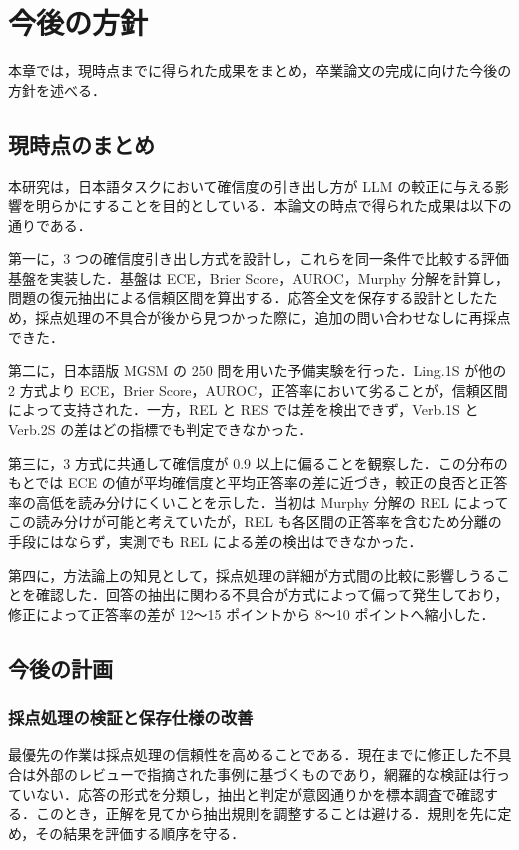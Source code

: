 \section{今後の方針}

本章では，現時点までに得られた成果をまとめ，卒業論文の完成に向けた今後の方針を述べる．

\subsection{現時点のまとめ}

本研究は，日本語タスクにおいて確信度の引き出し方が LLM の較正に与える影響を明らかにすることを目的としている．本論文の時点で得られた成果は以下の通りである．

第一に，3 つの確信度引き出し方式を設計し，これらを同一条件で比較する評価基盤を実装した．基盤は ECE，Brier Score，AUROC，Murphy 分解を計算し，問題の復元抽出による信頼区間を算出する．応答全文を保存する設計としたため，採点処理の不具合が後から見つかった際に，追加の問い合わせなしに再採点できた．

第二に，日本語版 MGSM の 250 問を用いた予備実験を行った．Ling.1S が他の2 方式より ECE，Brier Score，AUROC，正答率において劣ることが，信頼区間によって支持された．一方，REL と RES では差を検出できず，Verb.1S と Verb.2S の差はどの指標でも判定できなかった．

第三に，3 方式に共通して確信度が 0.9 以上に偏ることを観察した．この分布のもとでは ECE の値が平均確信度と平均正答率の差に近づき，較正の良否と正答率の高低を読み分けにくいことを示した．当初は Murphy 分解の REL によってこの読み分けが可能と考えていたが，REL も各区間の正答率を含むため分離の手段にはならず，実測でも REL による差の検出はできなかった．

第四に，方法論上の知見として，採点処理の詳細が方式間の比較に影響しうることを確認した．回答の抽出に関わる不具合が方式によって偏って発生しており，修正によって正答率の差が 12〜15 ポイントから 8〜10 ポイントへ縮小した．

\subsection{今後の計画}

\subsubsection{採点処理の検証と保存仕様の改善}

最優先の作業は採点処理の信頼性を高めることである．現在までに修正した不具合は外部のレビューで指摘された事例に基づくものであり，網羅的な検証は行っていない．応答の形式を分類し，抽出と判定が意図通りかを標本調査で確認する．このとき，正解を見てから抽出規則を調整することは避ける．規則を先に定め，その結果を評価する順序を守る．

